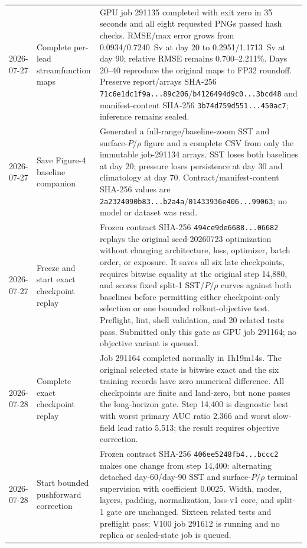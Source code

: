 \documentclass[11pt]{article}
\begin{document}
\begin{longtable}{@{}p{}p{}p{}@{}}
2026-07-27 & Complete per-lead streamfunction maps & GPU job 291135 completed with exit zero in 35 seconds and all eight requested PNGs passed hash checks.  RMSE/max error grows from 0.0934/0.7240~Sv at day 20 to 0.2951/1.1713~Sv at day 90; relative RMSE remains 0.700--2.211\%.  Days 20--40 reproduce the original maps to FP32 roundoff.  Preserve report/arrays SHA-256 \texttt{71c6e1dc1f9a...89c206}/\texttt{b4126494d9c0...3bcd48} and manifest-content SHA-256 \texttt{3b74d759d551...450ac7}; inference remains sealed. \\
2026-07-27 & Save Figure-4 baseline companion & Generated a full-range/baseline-zoom SST and surface-\(P/\rho\) figure and a complete CSV from only the immutable job-291134 arrays.  SST loses both baselines at day 20; pressure loses persistence at day 30 and climatology at day 70.  Contract/manifest-content SHA-256 values are \texttt{2a2324090b83...b2a4a}/\texttt{01433936e406...99063}; no model or dataset was read. \\
2026-07-27 & Freeze and start exact checkpoint replay & Frozen contract SHA-256 \texttt{494ce9de6688...06682} replays the original seed-20260723 optimization without changing architecture, loss, optimizer, batch order, or exposure.  It saves all six late checkpoints, requires bitwise equality at the original step 14,880, and scores fixed split-1 SST/\(P/\rho\) curves against both baselines before permitting either checkpoint-only selection or one bounded rollout-objective test.  Preflight, lint, shell validation, and 20 related tests pass.  Submitted only this gate as GPU job 291164; no objective variant is queued. \\
2026-07-28 & Complete exact checkpoint replay & Job 291164 completed normally in 1h19m14s.  The original selected state is bitwise exact and the six training records have zero numerical difference.  All checkpoints are finite and land-zero, but none passes the long-horizon gate.  Step 14,400 is diagnostic best with worst primary AUC ratio 2.366 and worst slow-field lead ratio 5.513; the result requires objective correction. \\
2026-07-28 & Start bounded pushforward correction & Frozen contract SHA-256 \texttt{406ee5248fb4...bccc2} makes one change from step 14,400: alternating detached day-60/day-90 SST and surface-\(P/\rho\) terminal supervision with coefficient 0.0025.  Width, modes, layers, padding, normalization, loss-v1 core, and split-1 gate are unchanged.  Sixteen related tests and preflight pass; V100 job 291612 is running and no replica or sealed-state job is queued. \\

\end{longtable}
\end{document}
